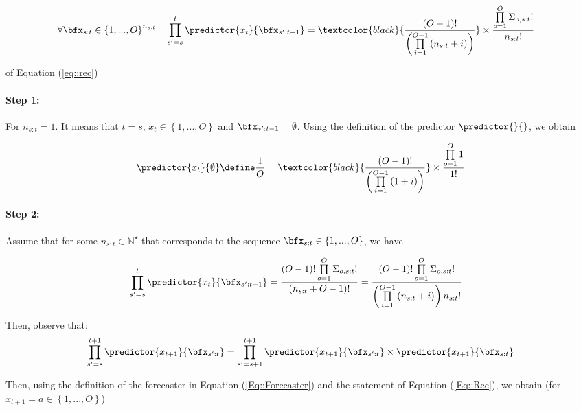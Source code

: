 \documentclass{article} %
\begin{document}
\begin{align}
\forall  \bfx_{s:t} \in \left\lbrace 1,..., O \right\rbrace^{n_{s:t}} \quad  \prod_{s'=s}^t  \predictor{x_{t}}{\bfx_{s':t-1}} & = \textcolor{black}{\frac{ (O-1)! }{ \left(\prod\limits_{i=1}^{O-1} \left( n_{s:t}+i \right) \right)}} \times \frac{\prod\limits_{o=1}^{O}  \Sigma_{o,s:t}! }{   n_{s:t}!}
\label{eq::rec}
\end{align}
\newpage
\begin{myproof}{of Equation (\ref{eq::rec})}
\paragraph{Step 1:} For $n_{s:t} = 1$. It means that $t=s$, $x_t \in \left\lbrace 1,..., O \right\rbrace$ and $\bfx_{s':t-1} = \emptyset$. Using the definition of the predictor $\predictor{}{}$, we obtain

\begin{align*}
    	\predictor{x_t}{\emptyset}  \define 
	\frac{ 1 }{ O}  = \textcolor{black}{\frac{ (O-1)! }{ \left(\prod\limits_{i=1}^{O-1} \left( 1+i \right) \right)}} \times \frac{\prod\limits_{o=1}^{O}  1 }{   1!}   
\end{align*}

\paragraph{Step 2:}
Assume that for some $n_{s:t} \in \mathbb{N}^\star$ that corresponds to the sequence $\bfx_{s:t} \in \left\lbrace 1,..., O \right\rbrace$, we have

\begin{align}
    \prod_{s'=s}^t  \predictor{x_{t}}{\bfx_{s':t-1}} &=  \frac{ (O-1)!
 \prod\limits_{o=1}^{O}  \Sigma_{o,s:t}! }{\left(n_{s:t}+O-1 \right)!} =  \frac{ (O-1)!
  \prod\limits_{o=1}^{O}  \Sigma_{o,s:t}! }{ \left(\prod\limits_{i=1}^{O-1} \left( n_{s:t}+i \right) \right)  n_{s:t}!}
  \label{Eq::Rec}
\end{align}

Then, observe that:
\begin{align*}
    \prod_{s'=s}^{t+1}  \predictor{x_{t+1}}{\bfx_{s':t}} = \prod_{s'=s+1}^{t+1}  \predictor{x_{t+1}}{\bfx_{s':t}} \times \predictor{x_{t+1}}{\bfx_{s:t}}
\end{align*}

Then, using the definition of the forecaster in Equation (\ref{Eq::Forecaster}) and the statement of Equation (\ref{Eq::Rec}), we obtain (for $x_{t+1} = a \in \left\lbrace 1,..., O \right\rbrace$)


\end{myproof}
\end{document}
